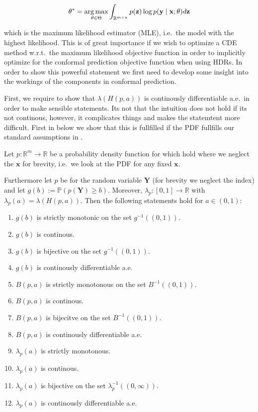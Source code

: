 \begin{equation}
    \theta^* = \operatorname*{arg\,max}_{\theta \in \Theta}  \int_{\mathbb{R}^{m + n}}
    p(\mathbf{z}) \log p(\mathbf{y} \mid \mathbf{x}; \theta) d
    \mathbf{z}
\end{equation}

which is the maximum likelihood estimator (MLE), i.e.\ the model with the highest likelihood. This is of great importance if we wish to optimize a CDE method w.r.t.\ the maximum likelihood objective function in order to implicitly optimize for the conformal prediction objective function when using HDRs. In order to show this powerful statement we first need to develop some insight into the workings of the components in conformal prediction.

First, we require to show that $\lambda(H(p, a))$ is continously differentiable a.e.\ in order to make sensible statements. Its not that the intuition does not hold if its not continous, however, it complicates things and makes the statemtent more difficult. First in  below we show that this is fullfilled if the PDF fullfills our standard assumptions in .

\begin{lemma}\label{lem:continuity}
    Let \(p: \mathbb{R}^m \to \mathbb{R}\) be a probability density function for which  hold where we neglect the $\mathbf{x}$ for brevity, i.e.\ we look at the PDF for any fixed $\mathbf{x}$.

    Furthermore let $p$ be for the random variable $\mathbf{Y}$ (for brevity we neglect the index) and let $g(b) := \mathbb{P}(p(\mathbf{Y}) \geq b)$. Moreover, $\lambda_p:[0, 1] \to \mathbb{R}$ with $\lambda_p(a) = \lambda(H(p, a))$. Then the following statements hold for $a \in (0,1)$:

    \begin{enumerate}
        \item $g(b)$ is strictly monotonic on the set $g^{-1}((0,1))$.
        \item $g(b)$ is continous.
        \item $g(b)$ is bijective on the set $g^{-1}((0,1))$.
        \item $g(b)$ is continously differentiable a.e.
        \item $B(p, a)$ is strictly monotonous on the set $B^{-1}((0,1))$.
        \item $B(p, a)$ is continous.
        \item $B(p, a)$ is bijecitve on the set $B^{-1}((0,1))$.
        \item $B(p, a)$ is continously differentiable a.e.
        \item $\lambda_p(a)$ is strictly monotonous.
        \item $\lambda_p(a)$ is continous.
        \item $\lambda_p(a)$ is bijective on the set $\lambda_p^{-1}((0,\infty))$.
        \item $\lambda_p(a)$ is continously differentiable a.e.
    \end{enumerate}
\end{lemma}

